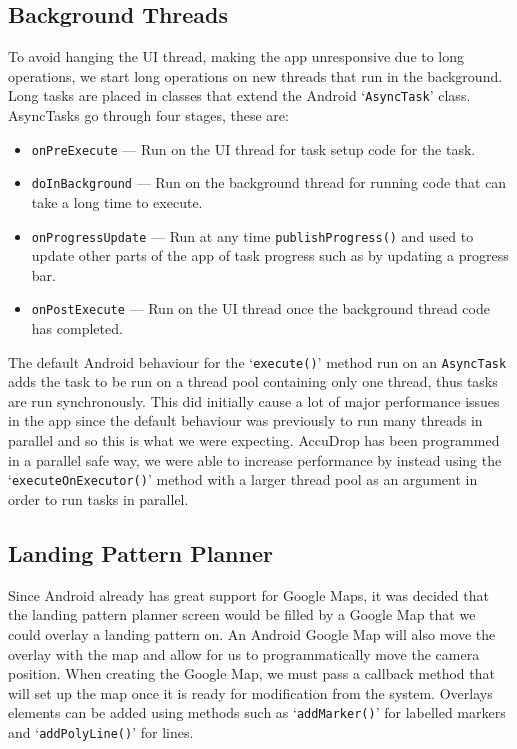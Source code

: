 \subsection{Background Threads}
To avoid hanging the UI thread, making the app unresponsive due to long operations, we start long operations on new threads that run in the background. Long tasks are placed in classes that extend the Android `\texttt{AsyncTask}' class. AsyncTasks go through four stages, these are:
\begin{itemize}
  \item \texttt{onPreExecute} --- Run on the UI thread for task setup code for the task.
  \item \texttt{doInBackground} --- Run on the background thread for running code that can take a long time to execute.
  \item \texttt{onProgressUpdate} --- Run at any time \texttt{publishProgress()} and used to update other parts of the app of task progress such as by updating a progress bar.
  \item \texttt{onPostExecute} --- Run on the UI thread once the background thread code has completed.
\end{itemize}

The default Android behaviour for the `\texttt{execute()}' method run on an \texttt{AsyncTask} adds the task to be run on a thread pool containing only one thread, thus tasks are run synchronously. This did initially cause a lot of major performance issues in the app since the default behaviour was previously to run many threads in parallel and so this is what we were expecting. AccuDrop has been programmed in a parallel safe way, we were able to increase performance by instead using the `\texttt{executeOnExecutor()}' method with a larger thread pool as an argument in order to run tasks in parallel.

\subsection{Landing Pattern Planner}
Since Android already has great support for Google Maps, it was decided that the landing pattern planner screen would be filled by a Google Map that we could overlay a landing pattern on. An Android Google Map will also move the overlay with the map and allow for us to programmatically move the camera position.
When creating the Google Map, we must pass a callback method that will set up the map once it is ready for modification from the system. Overlays elements can be added using methods such as `\texttt{addMarker()}' for labelled markers and `\texttt{addPolyLine()}' for lines.

